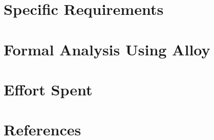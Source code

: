 \documentclass{config/PoliMi3i_thesis}
\numberwithin{algorithm}{chapter}
\begin{document}
\pagebreak
\chapter{Specific Requirements}



\pagebreak
\chapter{Formal Analysis Using Alloy}


\pagebreak
\chapter{Effort Spent}


\pagebreak
\chapter{References}

\pagebreak
\listoffigures
\listoftables
\end{document}
